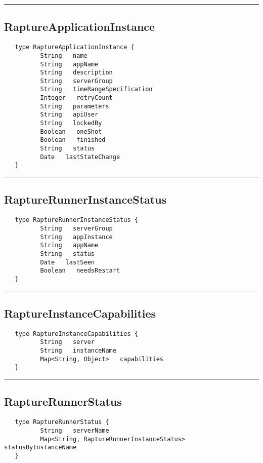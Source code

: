 \rule{15cm}{2pt}
\subsection{RaptureApplicationInstance}
\label{type:RaptureApplicationInstance}

\begin{verbatim}
   type RaptureApplicationInstance {
          String   name
          String   appName
          String   description
          String   serverGroup
          String   timeRangeSpecification
          Integer   retryCount
          String   parameters
          String   apiUser
          String   lockedBy
          Boolean   oneShot
          Boolean   finished
          String   status
          Date   lastStateChange
   }
\end{verbatim}

\rule{15cm}{2pt}
\subsection{RaptureRunnerInstanceStatus}
\label{type:RaptureRunnerInstanceStatus}

\begin{verbatim}
   type RaptureRunnerInstanceStatus {
          String   serverGroup
          String   appInstance
          String   appName
          String   status
          Date   lastSeen
          Boolean   needsRestart
   }
\end{verbatim}

\rule{15cm}{2pt}
\subsection{RaptureInstanceCapabilities}
\label{type:RaptureInstanceCapabilities}

\begin{verbatim}
   type RaptureInstanceCapabilities {
          String   server
          String   instanceName
          Map<String, Object>   capabilities
   }
\end{verbatim}

\rule{15cm}{2pt}
\subsection{RaptureRunnerStatus}
\label{type:RaptureRunnerStatus}

\begin{verbatim}
   type RaptureRunnerStatus {
          String   serverName
          Map<String, RaptureRunnerInstanceStatus>   statusByInstanceName
   }
\end{verbatim}

